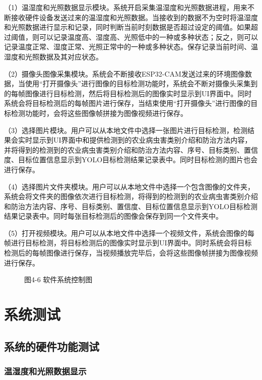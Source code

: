 \documentclass[12pt, a4paper, twoside]{ctexart}
\begin{document}
（1）温湿度和光照数据显示模块。系统开启采集温湿度和光照数据进程，用来不断接收硬件设备发送过来的温湿度和光照数据。当接收到的数据不为空时将温湿度和光照数据进行显示和记录，同时判断当前时刻数据是否超过设定的阈值。如果超过阈值，则可以记录温度高、湿度高、光照低中的一种或多种状态；反之，则可以记录温度正常、湿度正常、光照正常中的一种或多种状态。保存记录当前时间、温湿度和光照数据及其对应状态。

（2）摄像头图像采集模块。系统会不断接收ESP32-CAM发送过来的环境图像数据，当使用“打开摄像头”进行图像的目标检测功能时，系统会不断对摄像头采集到的每帧图像进行目标检测，然后将目标检测后的图像实时显示到UI界面中。同时系统会将目标检测后的每帧图片进行保存，当结束使用“打开摄像头”进行图像的目标检测功能时，会将这些图像帧拼接为图像视频进行保存。

（3）选择图片模块。用户可以从本地文件中选择一张图片进行目标检测，检测结果会实时显示到UI界面中和提供检测到的农业病虫害类别介绍和防治方法内容，并将得到的检测到的农业病虫害类别介绍和防治方法内容、序号、目标类别、置信度、目标位置信息显示到YOLO目标检测结果记录表中。同时目标检测的图片也会进行保存。

（4）选择图片文件夹模块。用户可以从本地文件中选择一个包含图像的文件夹，系统会将文件夹的图像依次进行目标检测，将得到的检测到的农业病虫害类别介绍和防治方法内容、序号、目标类别、置信度、目标位置信息显示到YOLO目标检测结果记录表中。同时每张目标检测后的图像会保存到同一个文件夹中。

（5）打开视频模块。用户可以从本地文件中选择一个视频文件，系统会图像的每帧进行目标检测，将目标检测后的图像实时显示到UI界面中。同时系统会将目标检测后的每帧图像进行保存，当视频播放完毕后，会将这些图像帧拼接为图像视频进行保存。


\begin{figure}[htbp]
\centering
\caption{图4-6 软件系统控制图}
\end{figure}


\chapter{系统测试}


\section{系统的硬件功能测试}


\subsection{温湿度和光照数据显示}
\end{document}
